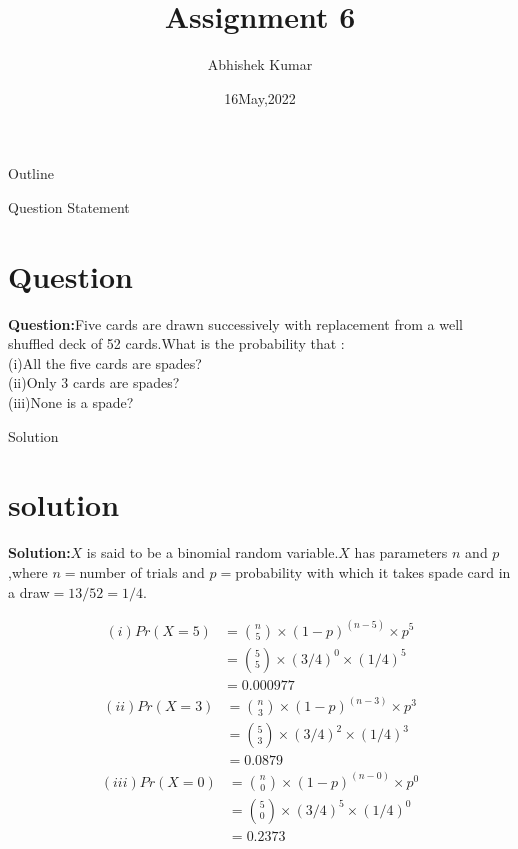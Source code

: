 \documentclass{beamer}
\title{Assignment 6}
\author{Abhishek Kumar}
\institute{IIT Hyderabad}
\date{16May,2022}
\begin{document}
	\begin{frame}
		\titlepage
	\end{frame}
	\begin{frame}{Outline}
		\tableofcontents
	\end{frame}
	\begin{frame}{Question Statement}
		\section{Question}
		\textbf{Question:}Five cards are drawn successively with replacement from a well shuffled deck of 52 cards.What is the probability that :\\
		(i)All the five cards are spades?\\
		(ii)Only 3 cards are spades?\\
		(iii)None is a spade?
	\end{frame}
	
	\begin{frame}{Solution}
		\section{solution}
		\textbf{Solution:}$X$ is said to be a binomial random variable.$X$ has parameters $n$ and $p$ ,where $n=$number of trials and $p=$probability with which it takes  spade card in a draw$=13/52=1/4$.
	\end{frame}
	\begin{frame}
		\begin{table}[ht!]
			\centering
			
			\caption{}
			\label{Table:1}
		\end{table}	
		\begin{table}[ht!]
			\centering
			
			\caption{}
			\label{Table:2}
		\end{table}	
		\begin{table}[ht!]
			\centering
			
			\caption{}
			\label{Table:3}
		\end{table}
	\end{frame}
	\begin{frame}
		\begin{align}
			(i) Pr{(X=5)} &= \binom{n}{5} \times {(1-p)}^{(n-5)} \times {p}^5\\
			&=\binom{5}{5} \times {(3/4)}^{0} \times {(1/4)}^5\\
			&=0.000977
		\end{align}
		\begin{align}
			(ii) Pr{(X=3)} &= \binom{n}{3} \times {(1-p)}^{(n-3)} \times {p}^3\\
			&=\binom{5}{3} \times {(3/4)}^{2} \times {(1/4)}^3\\
			&=0.0879
		\end{align}
		\begin{align}
			(iii) Pr{(X=0)} &= \binom{n}{0} \times {(1-p)}^{(n-0)} \times {p}^0\\
			&=\binom{5}{0} \times {(3/4)}^{5} \times {(1/4)}^0\\
			&=0.2373
		\end{align}
	\end{frame}
	
\end{document}
